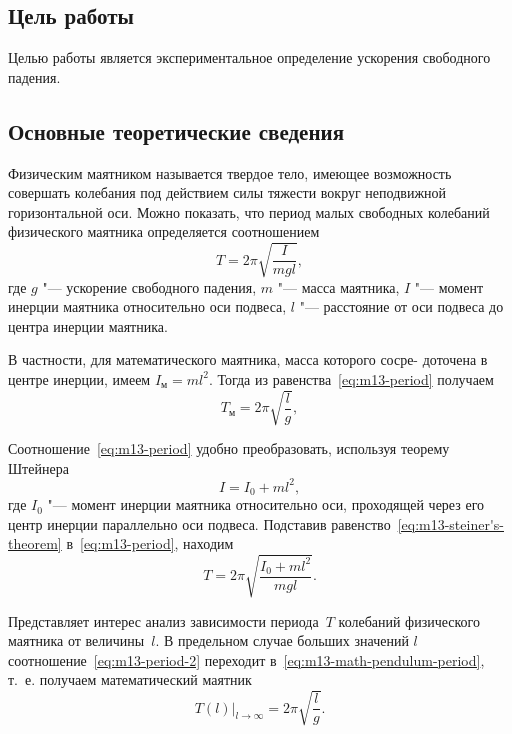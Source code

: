 \documentclass[a4paper, 12pt]{extarticle}
\begin{document}
\MTDTitlePage
\MTDInfoPage

\setcounter{section}{13}

\subsection{Цель работы}
Целью работы является экспериментальное определение ускорения свободного падения. 

\subsection{Основные теоретические сведения}
Физическим маятником называется твердое тело, имеющее возможность совершать колебания под действием силы тяжести вокруг неподвижной горизонтальной оси. Можно показать, что период малых свободных колебаний физического маятника определяется соотношением 
\begin{equation}
\label{eq:m13-period}
T = 2 \pi \sqrt{\frac{I}{mgl}},
\end{equation}
где $g$ "--- ускорение свободного падения, $m$ "--- масса маятника, $I$ "--- момент инерции маятника относительно оси подвеса, $l$ "--- расстояние от оси подвеса до центра инерции маятника.

В частности, для математического маятника, масса которого сосре-
доточена в центре инерции, имеем $I_\text{м} = ml^2$. Тогда из равенства~\eqref{eq:m13-period} получаем
\begin{equation}
\label{eq:m13-math-pendulum-period}
T_\text{м} = 2 \pi \sqrt{\frac{l}{g}},
\end{equation}

Соотношение~\eqref{eq:m13-period} удобно преобразовать, используя теорему 
Штейнера
\begin{equation}
\label{eq:m13-steiner's-theorem}
I = I_0 + ml^2,
\end{equation}
где $I_0$ "--- момент инерции маятника относительно оси, проходящей через его центр инерции параллельно оси подвеса. Подставив равенство~\eqref{eq:m13-steiner's-theorem} в~\eqref{eq:m13-period}, находим
\begin{equation}
\label{eq:m13-period-2}
T = 2 \pi \sqrt{\frac{I_0 + ml^2}{mgl}}.
\end{equation}

Представляет интерес анализ зависимости периода~$T$ колебаний физического маятника от величины~$l$. В предельном случае больших значений $l$ соотношение~\eqref{eq:m13-period-2} переходит в~\eqref{eq:m13-math-pendulum-period}, т.~е. получаем математический маятник 
\begin{equation}
\label{eq:m13-period-l-to-inf}
\left. T(l) \right|_{l \to \infty} = 2 \pi \sqrt{\frac{l}{g}}.
\end{equation}
\end{document}
